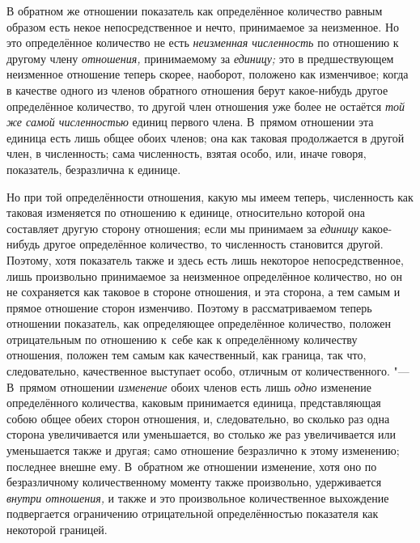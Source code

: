 В обратном же отношении показатель как определённое количество равным образом
есть некое непосредственное и нечто, принимаемое за неизменное. Но это
определённое количество не есть {\em неизменная численность} по отношению к
другому члену {\em отношения,} принимаемому за {\em единицу;} это в
предшествующем неизменное отношение теперь скорее, наоборот, положено как
изменчивое; когда в качестве одного из членов обратного отношения берут
какое-нибудь другое определённое количество, то другой член отношения уже более
не остаётся {\em той же самой численностью} единиц первого члена. В~прямом
отношении эта единица есть лишь общее обоих членов; она как таковая
продолжается в другой член, в численность; сама численность, взятая особо, или,
иначе говоря, показатель, безразлична к единице.

Но при той определённости отношения, какую мы имеем теперь, численность как
таковая изменяется по отношению к единице, относительно которой она составляет
другую сторону отношения; если мы принимаем за {\em единицу} какое-нибудь
другое определённое количество, то численность становится другой. Поэтому, хотя
показатель также и здесь есть лишь некоторое непосредственное, лишь произвольно
принимаемое за неизменное определённое количество, но он не сохраняется как
таковое в стороне отношения, и эта сторона, а тем самым и прямое отношение
сторон изменчиво. Поэтому в рассматриваемом теперь отношении показатель, как
определяющее определённое количество, положен отрицательным по отношению к~себе
как к определённому количеству отношения, положен тем самым как качественный,
как граница, так что, следовательно, качественное выступает особо, отличным от
количественного. "--- В~прямом отношении {\em изменение} обоих членов есть лишь
{\em одно} изменение определённого количества, каковым принимается единица,
представляющая собою общее обеих сторон отношения, и, следовательно, во сколько
раз одна сторона увеличивается или уменьшается, во столько же раз увеличивается
или уменьшается также и другая; само отношение безразлично к этому изменению;
последнее внешне ему. В~обратном же отношении изменение, хотя оно по
безразличному количественному моменту также произвольно, удерживается
{\em внутри отношения,} и также и это произвольное количественное выхождение
подвергается ограничению отрицательной определённостью показателя как
некоторой границей.

